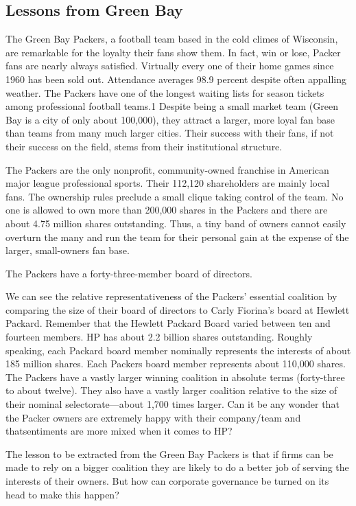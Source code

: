 \documentclass[10pt]{article}
\begin{document}
\subsection{Lessons from Green Bay}

{\large The Green Bay Packers, a football team based in the cold climes of
Wisconsin, are remarkable for the loyalty their fans show them. In fact, win or
lose, Packer fans are nearly always satisfied. Virtually every one of their home
games since 1960 has been sold out. Attendance averages 98.9 percent despite
often appalling weather. The Packers have one of the longest waiting lists for
season tickets among professional football teams.1 Despite being a small market
team (Green Bay is a city of only about 100,000), they attract a larger, more
loyal fan base than teams from many much larger cities. Their success with their
fans, if not their success on the field, stems from their institutional
structure.}

{\large The Packers are the only nonprofit, community-owned franchise in
American major league professional sports. Their 112,120 shareholders are mainly
local fans. The ownership rules preclude a small clique taking control of the
team. No one is allowed to own more than 200,000 shares in the Packers and there
are about 4.75 million shares outstanding. Thus, a tiny band of owners cannot
easily overturn the many and run the team for their personal gain at the expense
of the larger, small-owners fan base.}

{\large The Packers have a forty-three-member board of directors.}

{\large We can see the relative representativeness of the Packers' essential
coalition by comparing the size of their board of directors to Carly Fiorina's
board at Hewlett Packard. Remember that the Hewlett Packard Board varied between
ten and fourteen members. HP has about 2.2 billion shares outstanding. Roughly
speaking, each Packard board member nominally represents the interests of about
185 million shares. Each Packers board member represents about 110,000 shares.
The Packers have a vastly larger winning coalition in absolute terms (forty-three
to about twelve). They also have a vastly larger coalition relative to the size
of their nominal selectorate---about 1,700 times larger. Can it be any wonder
that the Packer owners are extremely happy with their company/team and
thatsentiments are more mixed when it comes to HP?}

{\large The lesson to be extracted from the Green Bay Packers is that if firms
can be made to rely on a bigger coalition they are likely to do a better job of
serving the interests of their owners. But how can corporate governance be turned
on its head to make this happen?}
\end{document}
